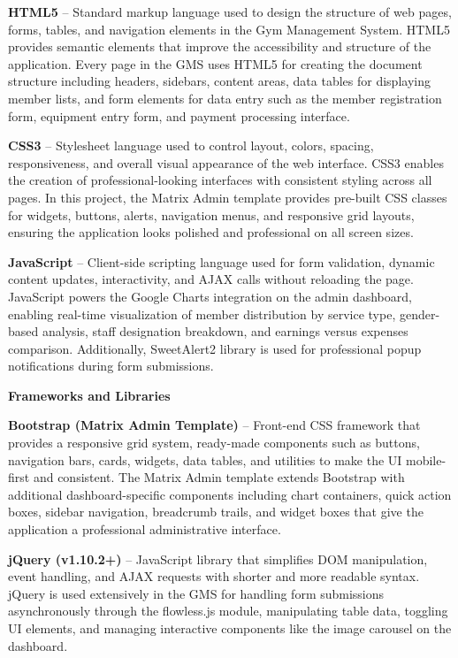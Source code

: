 \documentclass[12pt,a4paper]{report}
\begin{document}
\textbf{HTML5} -- Standard markup language used to design the structure of web pages, forms, tables, and navigation elements in the Gym Management System. HTML5 provides semantic elements that improve the accessibility and structure of the application. Every page in the GMS uses HTML5 for creating the document structure including headers, sidebars, content areas, data tables for displaying member lists, and form elements for data entry such as the member registration form, equipment entry form, and payment processing interface.

\textbf{CSS3} -- Stylesheet language used to control layout, colors, spacing, responsiveness, and overall visual appearance of the web interface. CSS3 enables the creation of professional-looking interfaces with consistent styling across all pages. In this project, the Matrix Admin template provides pre-built CSS classes for widgets, buttons, alerts, navigation menus, and responsive grid layouts, ensuring the application looks polished and professional on all screen sizes.

\textbf{JavaScript} -- Client-side scripting language used for form validation, dynamic content updates, interactivity, and AJAX calls without reloading the page. JavaScript powers the Google Charts integration on the admin dashboard, enabling real-time visualization of member distribution by service type, gender-based analysis, staff designation breakdown, and earnings versus expenses comparison. Additionally, SweetAlert2 library is used for professional popup notifications during form submissions.

\textbf{Frameworks and Libraries}

\textbf{Bootstrap (Matrix Admin Template)} -- Front-end CSS framework that provides a responsive grid system, ready-made components such as buttons, navigation bars, cards, widgets, data tables, and utilities to make the UI mobile-first and consistent. The Matrix Admin template extends Bootstrap with additional dashboard-specific components including chart containers, quick action boxes, sidebar navigation, breadcrumb trails, and widget boxes that give the application a professional administrative interface.

\textbf{jQuery (v1.10.2+)} -- JavaScript library that simplifies DOM manipulation, event handling, and AJAX requests with shorter and more readable syntax. jQuery is used extensively in the GMS for handling form submissions asynchronously through the flowless.js module, manipulating table data, toggling UI elements, and managing interactive components like the image carousel on the dashboard.
\end{document}
